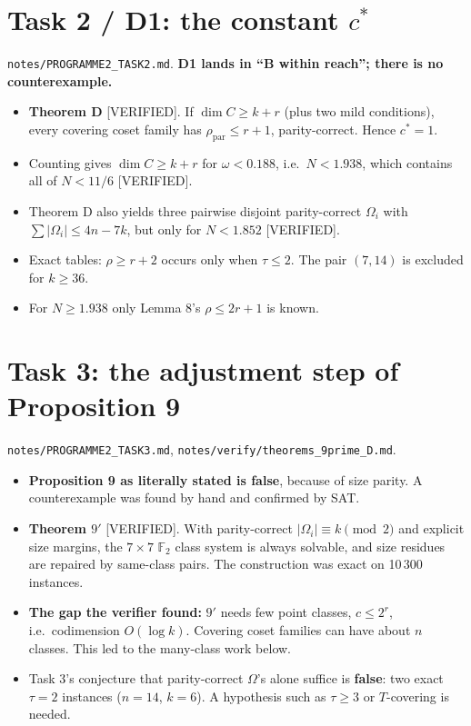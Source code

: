\documentclass[11pt]{article}
\newcommand{\lvl}[1]{\textsf{\small[#1]}}
\newcommand{\F}{\mathbb{F}_2}
\begin{document}
\section{Task 2 / D1: the constant $c^*$}
\texttt{notes/PROGRAMME2\_TASK2.md}. \textbf{D1 lands in ``B within reach''; there is no counterexample.}
\begin{itemize}
\item \textbf{Theorem D} \lvl{VERIFIED}. If $\dim C\ge k+r$ (plus two mild conditions), every covering coset family has
$\rho_{\mathrm{par}}\le r+1$, parity-correct. Hence $c^*=1$.
\item Counting gives $\dim C\ge k+r$ for $\omega<0.188$, i.e.\ $N<1.938$, which contains all of $N<11/6$
\lvl{VERIFIED}.
\item Theorem D also yields three pairwise disjoint parity-correct $\Omega_i$ with $\sum|\Omega_i|\le4n-7k$, but only for
$N<1.852$ \lvl{VERIFIED}.
\item Exact tables: $\rho\ge r+2$ occurs only when $\tau\le2$. The pair $(7,14)$ is excluded for $k\ge36$.
\item For $N\ge1.938$ only Lemma 8's $\rho\le2r+1$ is known.
\end{itemize}

\section{Task 3: the adjustment step of Proposition 9}
\texttt{notes/PROGRAMME2\_TASK3.md}, \texttt{notes/verify/theorems\_9prime\_D.md}.
\begin{itemize}
\item \textbf{Proposition 9 as literally stated is false}, because of size parity. A counterexample was found by hand and
confirmed by SAT.
\item \textbf{Theorem $9'$} \lvl{VERIFIED}. With parity-correct $|\Omega_i|\equiv k\pmod 2$ and explicit size margins,
the $7\times7$ $\F$ class system is always solvable, and size residues are repaired by same-class pairs. The construction
was exact on 10\,300 instances.
\item \textbf{The gap the verifier found:} $9'$ needs few point classes, $c\le2^r$, i.e.\ codimension $O(\log k)$. Covering
coset families can have about $n$ classes. This led to the many-class work below.
\item Task 3's conjecture that parity-correct $\Omega$'s alone suffice is \textbf{false}: two exact $\tau=2$ instances
($n=14$, $k=6$). A hypothesis such as $\tau\ge3$ or $T$-covering is needed.
\end{itemize}
\end{document}
